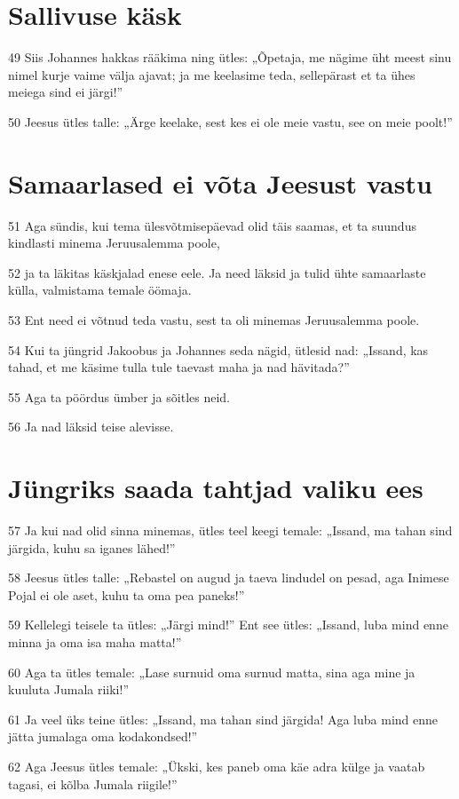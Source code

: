 \section*{Sallivuse käsk}

\par 49 Siis Johannes hakkas rääkima ning ütles: „Õpetaja, me nägime üht meest sinu nimel kurje vaime välja ajavat; ja me keelasime teda, sellepärast et ta ühes meiega sind ei järgi!”
\par 50 Jeesus ütles talle: „Ärge keelake, sest kes ei ole meie vastu, see on meie poolt!”

\section*{Samaarlased ei võta Jeesust vastu}

\par 51 Aga sündis, kui tema ülesvõtmisepäevad olid täis saamas, et ta suundus kindlasti minema Jeruusalemma poole,
\par 52 ja ta läkitas käskjalad enese eele. Ja need läksid ja tulid ühte samaarlaste külla, valmistama temale öömaja.
\par 53 Ent need ei võtnud teda vastu, sest ta oli minemas Jeruusalemma poole.
\par 54 Kui ta jüngrid Jakoobus ja Johannes seda nägid, ütlesid nad: „Issand, kas tahad, et me käsime tulla tule taevast maha ja nad hävitada?”
\par 55 Aga ta pöördus ümber ja sõitles neid.
\par 56 Ja nad läksid teise alevisse.

\section*{Jüngriks saada tahtjad valiku ees}

\par 57 Ja kui nad olid sinna minemas, ütles teel keegi temale: „Issand, ma tahan sind järgida, kuhu sa iganes lähed!”
\par 58 Jeesus ütles talle: „Rebastel on augud ja taeva lindudel on pesad, aga Inimese Pojal ei ole aset, kuhu ta oma pea paneks!”
\par 59 Kellelegi teisele ta ütles: „Järgi mind!” Ent see ütles: „Issand, luba mind enne minna ja oma isa maha matta!”
\par 60 Aga ta ütles temale: „Lase surnuid oma surnud matta, sina aga mine ja kuuluta Jumala riiki!”
\par 61 Ja veel üks teine ütles: „Issand, ma tahan sind järgida! Aga luba mind enne jätta jumalaga oma kodakondsed!”
\par 62 Aga Jeesus ütles temale: „Ükski, kes paneb oma käe adra külge ja vaatab tagasi, ei kõlba Jumala riigile!”



